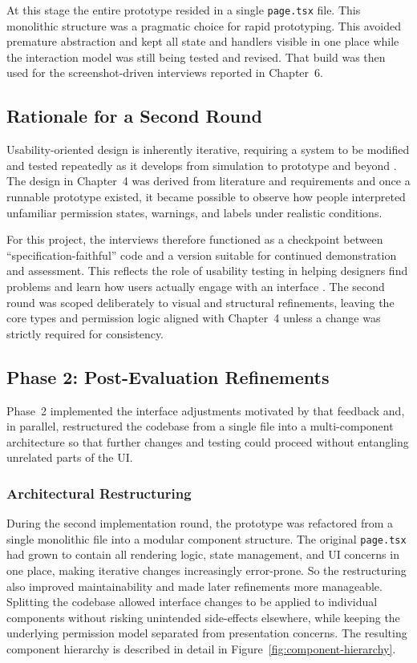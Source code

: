 At this stage the entire prototype resided in a single \texttt{page.tsx} file. This monolithic structure was a pragmatic choice for rapid prototyping. This avoided premature abstraction and kept all state and handlers visible in one place while the interaction model was still being tested and revised. That build was then used for the screenshot-driven interviews reported in Chapter~6.

\subsection*{Rationale for a Second Round}

Usability-oriented design is inherently iterative, requiring a system to be modified and tested repeatedly as it develops from simulation to prototype and beyond \cite{gould_lewis_1985}. The design in Chapter~4 was derived from literature and requirements and once a runnable prototype existed, it became possible to observe how people interpreted unfamiliar permission states, warnings, and labels under realistic conditions.

For this project, the interviews therefore functioned as a checkpoint between ``specification-faithful'' code and a version suitable for continued demonstration and assessment. This reflects the role of usability testing in helping designers find problems and learn how users actually engage with an interface \cite{moran_usability_testing_101}. The second round was scoped deliberately to visual and structural refinements, leaving the core types and permission logic aligned with Chapter~4 unless a change was strictly required for consistency. 

\subsection*{Phase 2: Post-Evaluation Refinements}

Phase~2 implemented the interface adjustments motivated by that feedback and, in parallel, restructured the codebase from a single file into a multi-component architecture so that further changes and testing could proceed without entangling unrelated parts of the UI.

\subsubsection*{Architectural Restructuring}
During the second implementation round, the prototype was refactored from a single monolithic file into a modular component structure. The original \texttt{page.tsx} had grown to contain all rendering logic, state management, and UI concerns in one place, making iterative changes increasingly error-prone. So the restructuring also improved maintainability and made later refinements more manageable. Splitting the codebase allowed interface changes to be applied to individual components without risking unintended side-effects elsewhere, while keeping the underlying permission model separated from presentation concerns. The resulting component hierarchy is described in detail in Figure~\ref{fig:component-hierarchy}.

